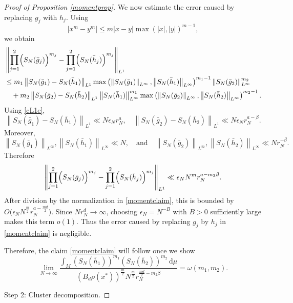 \documentclass[10pt,a4paper]{amsart}
\renewcommand{\d}{\, \text{d}}
\begin{document}
\begin{proof}[Proof of Proposition \ref{momentprop}]
We now estimate the error caused by replacing $g_j$ with $h_j$. Using
$$|x^m-y^m|\le m|x-y|\max(|x|,|y|)^{m-1}, $$
we obtain
\begin{equation*}
\begin{aligned}
&\left\|\prod_{j=1}^2 \Bigl(S_N(\bar g_j)\Bigr)^{m_j}-\prod_{j=1}^2 \Bigl(S_N(\bar h_j)\Bigr)^{m_j}\right\|_{L^1}\\
&\le m_1\left\|S_N(\bar g_1)-S_N(\bar h_1)\right\|_{L^1}\max\left(\left\|S_N(\bar g_1)\right\|_{L^\infty},
\left\|S_N(\bar h_1)\right\|_{L^\infty}\right)^{m_1-1}\left\|S_N(\bar g_2)\right\|_{L^\infty}^{m_2} \\
&\quad+m_2\left\|S_N(\bar g_2)-S_N(\bar h_2)\right\|_{L^1}\left\|S_N(\bar h_1)\right\|_{L^\infty}^{m_1}
\max\left(\left\|S_N(\bar g_2)\right\|_{L^\infty},\left\|S_N(\bar h_2)\right\|_{L^\infty}\right)^{m_2-1}.
\end{aligned}
\end{equation*}
Using \eqref{cL1e},
$$\left\|S_N(\bar g_1)-S_N(\bar h_1)\right\|_{L^1}\ll N\epsilon_N r_N^a,\quad
\left\|S_N(\bar g_2)-S_N(\bar h_2)\right\|_{L^1}\ll N\epsilon_N r_N^{a-\beta}.$$
Moreover,
$$\left\|S_N(\bar g_1)\right\|_{L^\infty},\left\|S_N(\bar h_1)\right\|_{L^\infty}\ll N,
\quad\text{and}\quad
\left\|S_N(\bar g_2)\right\|_{L^\infty},\left\|S_N(\bar h_2)\right\|_{L^\infty}\ll Nr_N^{-\beta}.$$
Therefore
$$\left\|\prod_{j=1}^2 \Bigl(S_N(\bar g_j)\Bigr)^{m_j}-\prod_{j=1}^2 \Bigl(S_N(\bar h_j)\Bigr)^{m_j}\right\|_{L^1}\ll \epsilon_N N^m r_N^{a-m_2\beta}.
$$
After division by the normalization in \eqref{momentclaim}, this is bounded by
$O\bigl(\epsilon_N N^{\frac{m}{2}}r_N^{a-\frac{md}{2}}\bigr).$
Since $Nr_N^d\to\infty$, choosing $\epsilon_N=N^{-B}$ with $B>0$ sufficiently large makes this term $o(1)$. Thus the error caused by replacing  $g_j$ by $h_j$ in \eqref{momentclaim} is negligible.




Therefore, the claim \eqref{momentclaim} will follow once we show
\begin{equation}\label{hbarerr}
\lim_{N\rightarrow\infty} \frac{\int_M \left(S_N(\bar{h}_1) \right)^{m_1} \left(S_N(\bar{h}_2)\right)^{m_2}\d\mu}{\left(B_d \rho(x^*)\right)^{\frac{m}{2}} N^{\frac{m}{2}} r_N^{\frac{md}{2}-m_2\beta }}=\omega(m_1,m_2).
\end{equation}


Step 2: Cluster decomposition.


\end{proof}
\end{document}
